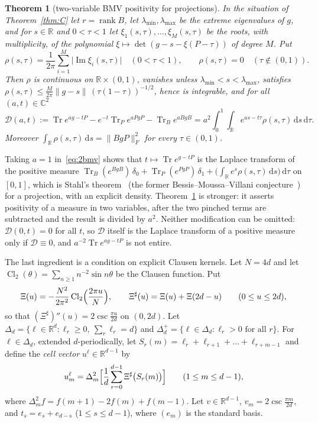 \documentclass[11pt]{amsart}
\newtheorem{introthm}{Theorem}
\theoremstyle{definition}
\theoremstyle{remark}
\numberwithin{equation}{section}
\newcommand{\R}{\mathbb{R}}
\newcommand{\C}{\mathbb{C}}
\newcommand{\Tr}{\operatorname{Tr}}
\renewcommand{\Im}{\operatorname{Im}}
\newcommand{\Cl}{\operatorname{Cl}_2}
\newcommand{\cD}{\mathcal{D}}
\newcommand{\Sh}{\Xi^{\sharp}}
\newcommand{\lmin}{\lambda_{\min}}
\newcommand{\lmax}{\lambda_{\max}}
\newcommand{\dd}{\,\mathrm{d}}
\begin{document}
\begin{introthm}[two-variable BMV positivity for projections]\label{thm:D}
In the situation of Theorem~\ref{thm:C} let $r=\operatorname{rank}B$, let $\lmin,\lmax$ be the extreme eigenvalues of
$g$, and for $s\in\R$ and $0<\tau<1$ let $\xi_1(s,\tau),\dots,\xi_M(s,\tau)$ be the roots, with multiplicity, of the
polynomial $\xi\mapsto\det(g-s-\xi(P-\tau))$ of degree $M$. Put
\[
\rho(s,\tau)=\frac1{2\pi}\sum_{i=1}^M\bigl|\Im\xi_i(s,\tau)\bigr|\quad(0<\tau<1),\qquad \rho(s,\tau)=0\quad(\tau\notin(0,1)).
\]
Then $\rho$ is continuous on $\R\times(0,1)$, vanishes unless $\lmin<s<\lmax$, satisfies
$\rho(s,\tau)\le\frac{M}{2\pi}\|g-s\|\,(\tau(1-\tau))^{-1/2}$, hence is integrable, and for all $(a,t)\in\C^2$
\begin{equation}\label{eq:2bmv}
\cD(a,t):=\Tr e^{ag-tP}-e^{-t}\Tr_Pe^{aPgP}-\Tr_Be^{aBgB}=a^2\int_0^1\!\!\int_\R e^{as-t\tau}\rho(s,\tau)\dd s\dd\tau .
\end{equation}
Moreover $\int_\R\rho(s,\tau)\dd s=\|BgP\|_F^2$ for every $\tau\in(0,1)$.
\end{introthm}

Taking $a=1$ in~\eqref{eq:2bmv} shows that $t\mapsto\Tr e^{g-tP}$ is the Laplace transform of the positive measure
$\Tr_B(e^{BgB})\,\delta_0+\Tr_P(e^{PgP})\,\delta_1+\bigl(\int_\R e^s\rho(s,\tau)\dd s\bigr)\dd\tau$ on $[0,1]$, which
is Stahl's theorem~\cite{Stahl} (the former Bessis--Moussa--Villani conjecture~\cite{BMV}) for a projection, with an
explicit density. Theorem~\ref{thm:D} is stronger: it asserts positivity of a measure in two variables, after the
two pinched terms are subtracted and the result is divided by $a^2$. Neither modification can be omitted:
$\cD(0,t)=0$ for all $t$, so $\cD$ itself is the Laplace transform of a positive measure only if $\cD\equiv0$, and
$a^{-2}\Tr e^{ag-tP}$ is not entire.

The last ingredient is a condition on explicit Clausen kernels. Let $N=4d$ and let
$\Cl(\theta)=\sum_{n\ge1}n^{-2}\sin n\theta$ be the Clausen function. Put
\[
\Xi(u)=-\frac{N^2}{2\pi^2}\Cl\Bigl(\frac{2\pi u}{N}\Bigr),\qquad \Sh(u)=\Xi(u)+\Xi(2d-u)\qquad(0\le u\le2d),
\]
so that $(\Sh)''(u)=2\csc\frac{\pi u}{2d}$ on $(0,2d)$. Let $\Delta_d=\{\ell\in\R^d:\ell_r\ge0,\ \sum_r\ell_r=d\}$
and $\Delta_d^+=\{\ell\in\Delta_d:\ell_r>0\text{ for all }r\}$. For $\ell\in\Delta_d$, extended $d$-periodically, let
$S_r(m)=\ell_r+\ell_{r+1}+\dots+\ell_{r+m-1}$ and define the \emph{cell vector} $u^\ell\in\R^{d-1}$ by
\begin{equation}\label{eq:uell}
u^\ell_m=\Delta^2_m\Bigl[\frac1d\sum_{r=0}^{d-1}\Sh\bigl(S_r(m)\bigr)\Bigr]\qquad(1\le m\le d-1),
\end{equation}
where $\Delta^2_m f=f(m+1)-2f(m)+f(m-1)$. Let $v\in\R^{d-1}$, $v_m=2\csc\frac{\pi m}{2d}$, and
$t_s=e_s+e_{d-s}$ ($1\le s\le d-1$), where $(e_m)$ is the standard basis.
\end{document}

